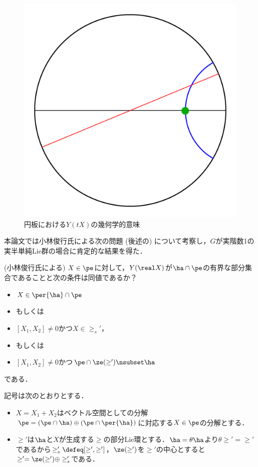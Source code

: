 \begin{figure}[H]
  \centering
  \includegraphics[scale=0.3]{../graph/y-and-z.pdf}
  \caption{{\Poincare}円板における$Y(tX) $の幾何学的意味}
  \label{fig:y-and-z}
\end{figure}

本論文では小林俊行氏による次の問題 (後述の) について考察し，$G$が実階数1の実半単純Lie群の場合に肯定的な結果を得た．
\begin{prob*}(小林俊行氏による)
  $X\in  \pe$に対して，$Y(\real X)$が$ \ha\cap \pe$の有界な部分集合であることと次の条件は同値であるか？
  \begin{cond*}
    \leavevmode
    \begin{itemize}
    \item $X\in \per{\ha}\cap\pe $
    \item[] もしくは
    \item $[X_1, X_2] \neq 0 $かつ$X\in \ge_{s}' $，
    \item[] もしくは
    \item $[X_1, X_2] \neq 0 $かつ$\pe\cap \ze(\ge') \nsubset \ha  $
    \end{itemize}
    である．
  \end{cond*}

  記号は次のとおりとする．
  \begin{itemize}
  \item $X = X_1 + X_2 $はベクトル空間としての分解$\pe =(\pe\cap \ha)\oplus(\pe\cap\per{\ha}) $に対応する$X\in \pe$の分解とする．
  \item $\ge ' $は$\ha$と$X$が生成する$\ge$の部分Lie環とする．$\ha = \theta \ha$より$\theta \ge' = \ge'$であるから$\ge'_{s} \defeq [\ge',\ge'] $，$\ze(\ge') $を$\ge'$の中心とすると$\ge' = \ze(\ge') \oplus \ge'_{s} $である．
  \end{itemize}
\end{prob*}

